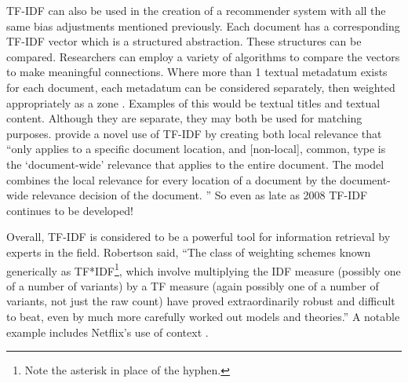 TF-IDF can also be used in the creation of a recommender system with all the same bias adjustments mentioned previously. Each document has a corresponding TF-IDF vector which is a structured abstraction. These structures can be compared. Researchers can employ a variety of algorithms to compare the vectors to make meaningful connections. %
Where more than 1 textual metadatum exists for each document, each metadatum can be considered separately, then weighted appropriately as a zone \citep{manning_raghavan_2008_scoring}. Examples of this would be textual titles and textual content. Although they are separate, they may both be used for matching purposes. \citeauthor{Wu:2008:Interpreting_tf_idf_term_weights} provide a novel use of TF-IDF by creating both local relevance that ``only applies to a specific document location, and [non-local], common, type is the `document-wide' relevance that applies to the entire document. The model combines the local relevance for every location of a document by the document-wide relevance decision of the document. \citeyearpar{Wu:2008:Interpreting_tf_idf_term_weights}'' So even as late as 2008 TF-IDF continues to be developed!

Overall, TF-IDF is considered to be a powerful tool for information retrieval by experts in the field. Robertson \citeyearpar{understanding_idf_2004} said, ``The class of weighting schemes known generically as TF*IDF\footnote{Note the asterisk in place of the hyphen.}, which involve multiplying the IDF measure (possibly one of a number of variants) by a TF measure (again possibly one of a number of variants, not just the raw count) have proved extraordinarily robust and difficult to beat, even by much more carefully worked out models and theories.'' A notable example includes Netflix's use of context \citep{Bell:2007:lessons_from_the_netflix_prize}.


